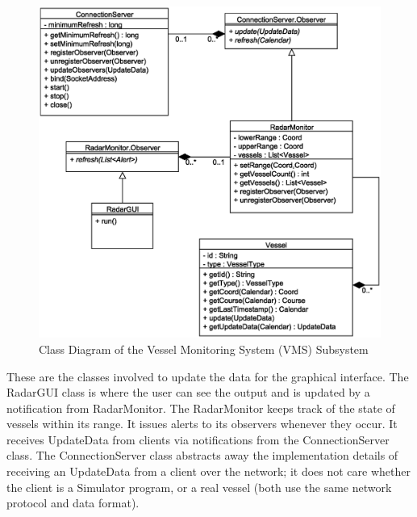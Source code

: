 \documentclass{article}
\begin{document}
\begin{figure}[!htb]	
\caption{Class Diagram of the Vessel Monitoring System (VMS) Subsystem}
\centering
\includegraphics[scale=0.3]{diagrams/vms-class-diagram.eps}
\end{figure}
These are the classes involved to update the data for the graphical interface. The RadarGUI class is where the user can see the output and is updated by a notification from RadarMonitor.
The RadarMonitor keeps track of the state of vessels within its range. It issues alerts to its observers whenever they occur. It receives UpdateData from clients via notifications from the ConnectionServer class.
The ConnectionServer class abstracts away the implementation details of receiving an UpdateData from a client over the network; it does not care whether the client is a Simulator program, or a real vessel (both use the same network protocol and data format).
\end{document}
